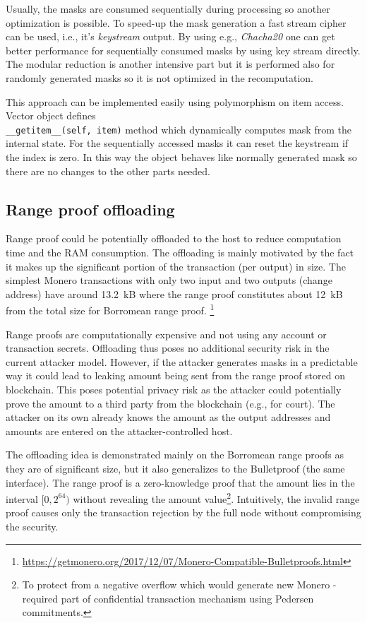 \documentclass[]{article}
\begin{document}
Usually, the masks are consumed sequentially during processing so another optimization is possible. To speed-up the mask generation a fast stream cipher can be used, i.e., it's \emph{keystream} output. By using e.g., \emph{Chacha20} one can get better performance for sequentially consumed masks by using key stream directly. The modular reduction is another intensive part but it is performed also for randomly generated masks so it is not optimized in the recomputation.

This approach can be implemented easily using polymorphism on item access. Vector object defines \\ \verb|__getitem__(self, item)| method which dynamically computes mask from the internal state. For the sequentially accessed masks it can reset the keystream if the index is zero. In this way the object behaves like normally generated mask so there are no changes to the other parts needed. 


\subsection{Range proof offloading}
Range proof could be potentially offloaded to the host to reduce computation time and the RAM consumption.
The offloading is mainly motivated by the fact it makes up the significant portion of the transaction (per output) in size. The simplest Monero transactions with only two input and two outputs (change address) have around 
13.2~kB where the range proof constitutes about 12~kB from the total size for Borromean range proof. \footnote{\url{https://getmonero.org/2017/12/07/Monero-Compatible-Bulletproofs.html}}

Range proofs are computationally expensive and not using any account or transaction secrets. Offloading thus poses no additional security risk in the current attacker model. However, if the attacker generates masks in a predictable way it could lead to leaking amount being sent from the range proof stored on blockchain. This poses potential privacy risk as the attacker could potentially prove the amount to a third party from the blockchain (e.g., for court). The attacker on its own already knows the amount as the output addresses and amounts are entered on the attacker-controlled host.

The offloading idea is demonstrated mainly on the Borromean range proofs as they are of significant size, but it also generalizes to the Bulletproof (the same interface). 
The range proof is a zero-knowledge proof that the amount lies in the interval $[0, 2^{64})$ without revealing the amount value\footnote{To protect from a negative overflow which would generate new Monero - required part of confidential transaction mechanism using Pedersen commitments.}. Intuitively, the invalid range proof causes only the transaction rejection by the full node without compromising the security.
\end{document}
